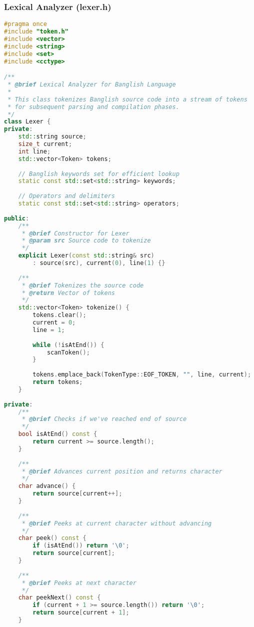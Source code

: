 \documentclass[12pt,a4paper]{article}
\begin{document}
\subsubsection{Lexical Analyzer (lexer.h)}

\begin{lstlisting}[language=C++, caption=Lexical Analyzer Implementation]
#pragma once
#include "token.h"
#include <vector>
#include <string>
#include <set>
#include <cctype>

/**
 * @brief Lexical Analyzer for Banglish Language
 * 
 * This class tokenizes Banglish source code into a stream of tokens
 * for subsequent parsing and compilation phases.
 */
class Lexer {
private:
    std::string source;
    size_t current;
    int line;
    std::vector<Token> tokens;
    
    // Banglish keywords set for efficient lookup
    static const std::set<std::string> keywords;
    
    // Operators and delimiters
    static const std::set<std::string> operators;
    
public:
    /**
     * @brief Constructor for Lexer
     * @param src Source code to tokenize
     */
    explicit Lexer(const std::string& src) 
        : source(src), current(0), line(1) {}
    
    /**
     * @brief Tokenizes the source code
     * @return Vector of tokens
     */
    std::vector<Token> tokenize() {
        tokens.clear();
        current = 0;
        line = 1;
        
        while (!isAtEnd()) {
            scanToken();
        }
        
        tokens.emplace_back(TokenType::EOF_TOKEN, "", line, current);
        return tokens;
    }
    
private:
    /**
     * @brief Checks if we've reached end of source
     */
    bool isAtEnd() const {
        return current >= source.length();
    }
    
    /**
     * @brief Advances current position and returns character
     */
    char advance() {
        return source[current++];
    }
    
    /**
     * @brief Peeks at current character without advancing
     */
    char peek() const {
        if (isAtEnd()) return '\0';
        return source[current];
    }
    
    /**
     * @brief Peeks at next character
     */
    char peekNext() const {
        if (current + 1 >= source.length()) return '\0';
        return source[current + 1];
    }
    

\end{lstlisting}
\end{document}
